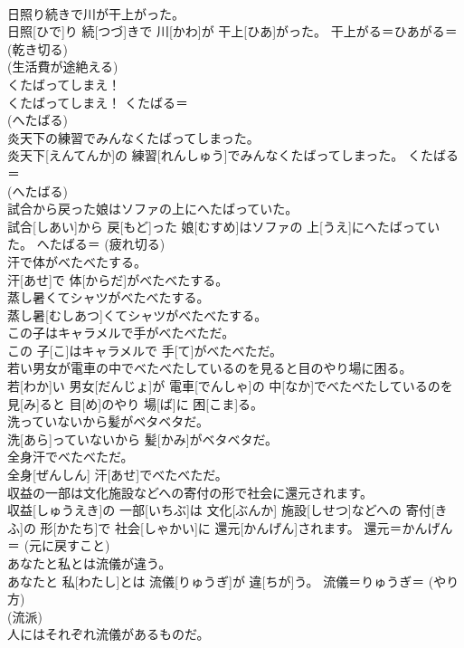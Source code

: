 \documentclass[8pt]{extreport}
\begin{document}
\begin{CJK}{UTF8}{min}
{\\	日照り続きで川が干上がった。	
\\	日照[ひで]り 続[つづ]きで 川[かわ]が 干上[ひあ]がった。	干上がる＝ひあがる＝ (乾き切る) 
\\	(生活費が途絶える)
\\	くたばってしまえ！	
\\	くたばってしまえ！	くたばる＝ 
\\	(へたばる) 
\\	炎天下の練習でみんなくたばってしまった。	
\\	炎天下[えんてんか]の 練習[れんしゅう]でみんなくたばってしまった。	くたばる＝ 
\\	(へたばる) 
\\	試合から戻った娘はソファの上にへたばっていた。	
\\	試合[しあい]から 戻[もど]った 娘[むすめ]はソファの 上[うえ]にへたばっていた。	へたばる＝ (疲れ切る) 
\\	汗で体がべたべたする。	
\\	汗[あせ]で 体[からだ]がべたべたする。	
\\	蒸し暑くてシャツがべたべたする。	
\\	蒸し暑[むしあつ]くてシャツがべたべたする。	
\\	この子はキャラメルで手がべたべただ。	
\\	この 子[こ]はキャラメルで 手[て]がべたべただ。	
\\	若い男女が電車の中でべたべたしているのを見ると目のやり場に困る。	
\\	若[わか]い 男女[だんじょ]が 電車[でんしゃ]の 中[なか]でべたべたしているのを 見[み]ると 目[め]のやり 場[ば]に 困[こま]る。	
\\	洗っていないから髪がベタベタだ。	
\\	洗[あら]っていないから 髪[かみ]がベタベタだ。	
\\	全身汗でべたべただ。	
\\	全身[ぜんしん] 汗[あせ]でべたべただ。	
\\	収益の一部は文化施設などへの寄付の形で社会に還元されます。	
\\	収益[しゅうえき]の 一部[いちぶ]は 文化[ぶんか] 施設[しせつ]などへの 寄付[きふ]の 形[かたち]で 社会[しゃかい]に 還元[かんげん]されます。	還元＝かんげん＝ (元に戻すこと) 
\\	あなたと私とは流儀が違う。	
\\	あなたと 私[わたし]とは 流儀[りゅうぎ]が 違[ちが]う。	流儀＝りゅうぎ＝ (やり方) 
\\	(流派) 
\\	人にはそれぞれ流儀があるものだ。	
}
\end{CJK}
\end{document}
